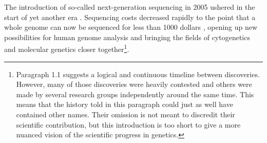 The introduction of so-called next-generation sequencing in 2005 ushered in the start of yet another era \cite{Mardis_2013}. 
Sequencing costs decreased rapidly to the point that a whole genome can now be sequenced for less than 1000 dollars \cite{Goodwin_2016}, opening up new possibilities for human genome analysis and bringing the fields of cytogenetics and molecular genetics closer together\footnote{Paragraph 1.1 suggests a logical and continuous timeline between discoveries. However, many of those discoveries were heavily contested and others were made by several research groups independently around the same time. This means that the history told in this paragraph could just as well have contained other names. Their omission is not meant to discredit their scientific contribution, but this introduction is too short to give a more nuanced vision of the scientific progress in genetics.}. 



